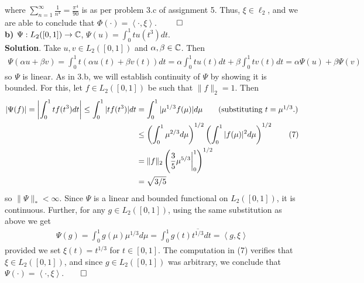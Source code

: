 \documentclass[10pt]{article}
\newcommand{\1}[1]{\mathbbm{1}_{#1}} \newcommand{\mc}[1]{\mathcal{#1}}
\newcommand{\ip}[2]{\left\langle#1,#2\right\rangle }
\begin{document}
    where $\sum_{n=1}^\infty\frac{1}{n^4}=\frac{\pi^4}{90}$ is as per problem 3.c of assignment 5. Thus, $\xi\in\ell_2$, and we are able to conclude that $\Phi(\cdot)=\ip{\cdot}{\xi}$. \hfill{$\qed$}\\[5pt]
    {\bf b)} $\Psi:L_2([0,1])\rightarrow\mathbb{C}$, $\Psi(u)=\int_0^1 tu(t^3)dt$.\\[5pt]
    {\bf Solution}. Take $u,v\in L_2([0,1])$ and $\alpha,\beta\in\mathbb{C}$. Then
    \begin{align*}
        \Psi(\alpha u+\beta v)=\int_0^1t(\alpha u(t)+\beta v(t))dt=\alpha\int_0^1tu(t)dt+\beta\int_0^1tv(t)dt=\alpha\Psi(u)+\beta\Psi(v)
    \end{align*}
    so $\Psi$ is linear. As in 3.b, we will establish continuity of $\Psi$ by showing it is bounded. For this, let $f\in L_2([0,1])$ be such that $\|f\|_2=1$. Then
    \begin{align*}
        |\Psi(f)|=\left|\int_0^1tf(t^3)dt\right|\leq\int_0^1|tf(t^3)|dt&=\int_0^1|\mu^{1/3} f(\mu)|d\mu\tag{substituting $t=\mu^{1/3}$.}\\
        &\leq\left(\int_0^1\mu^{2/3}d\mu\right)^{1/2}\left(\int_0^1|f(\mu)|^2d\mu\right)^{1/2}\tag{7}\\
        &=\|f\|_2\left(\frac{3}{5}\mu^{5/3}\bigg|^1_0\right)^{1/2}\\
        &=\sqrt{3/5}
    \end{align*}
    so $\|\Psi\|_\ast<\infty$. Since $\Psi$ is a linear and bounded functional on $L_2([0,1])$, it is continuous. Further, for any $g\in L_2([0,1])$, using the same substitution as above we get
    \begin{align*}
        \Psi(g)=\int_0^1g(\mu)\mu^{1/3}d\mu=\int_{0}^{1}g(t)\overline{t^{1/3}}dt=\ip{g}{\xi}
    \end{align*}
    provided we set $\xi(t)=t^{1/3}$ for $t\in[0,1]$. The computation in (7) verifies that $\xi\in L_2([0,1])$, and since $g\in L_2([0,1])$ was arbitrary, we conclude that $\Psi(\cdot)=\ip{\cdot}{\xi}$.\hfill{$\qed$}\\[5pt]
    
    
\end{document}
